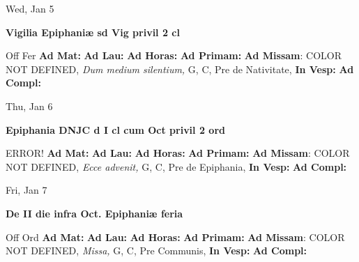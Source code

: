\documentclass[10pt]{memoir}
\begin{document}
\begin{center}
\begin{minipage}{3.5in}
\vspace{2em}
\begin{center}Wed, Jan 5
\end{center}
\textbf{ \large Vigilia Epiphaniæ
\textnormal{\normalsize sd Vig privil 2 cl}}

\begin{justify}Off Fer
\textbf{Ad Mat: }
\textbf{Ad Lau: }
\textbf{Ad Horas: }
\textbf{Ad Primam: }\textbf{Ad Missam}: COLOR NOT DEFINED, \textit{Dum medium silentium,} G, C, Pre de Nativitate, 
\textbf{In Vesp: }
\textbf{Ad Compl: }
\end{justify}
\end{minipage}
\end{center}

\begin{center}
\begin{minipage}{3.5in}
\vspace{2em}
\begin{center}Thu, Jan 6
\end{center}
\textbf{ \large Epiphania DNJC
\textnormal{\normalsize d I cl cum Oct privil 2 ord}}

\begin{justify}ERROR!
\textbf{Ad Mat: }
\textbf{Ad Lau: }
\textbf{Ad Horas: }
\textbf{Ad Primam: }\textbf{Ad Missam}: COLOR NOT DEFINED, \textit{Ecce advenit,} G, C, Pre de Epiphania, 
\textbf{In Vesp: }
\textbf{Ad Compl: }
\end{justify}
\end{minipage}
\end{center}

\begin{center}
\begin{minipage}{3.5in}
\vspace{2em}
\begin{center}Fri, Jan 7
\end{center}
\textbf{ \large De II die infra Oct. Epiphaniæ
\textnormal{\normalsize feria}}

\begin{justify}Off Ord
\textbf{Ad Mat: }
\textbf{Ad Lau: }
\textbf{Ad Horas: }
\textbf{Ad Primam: }\textbf{Ad Missam}: COLOR NOT DEFINED, \textit{Missa,} G, C, Pre Communis, 
\textbf{In Vesp: }
\textbf{Ad Compl: }
\end{justify}
\end{minipage}
\end{center}
\end{document}
